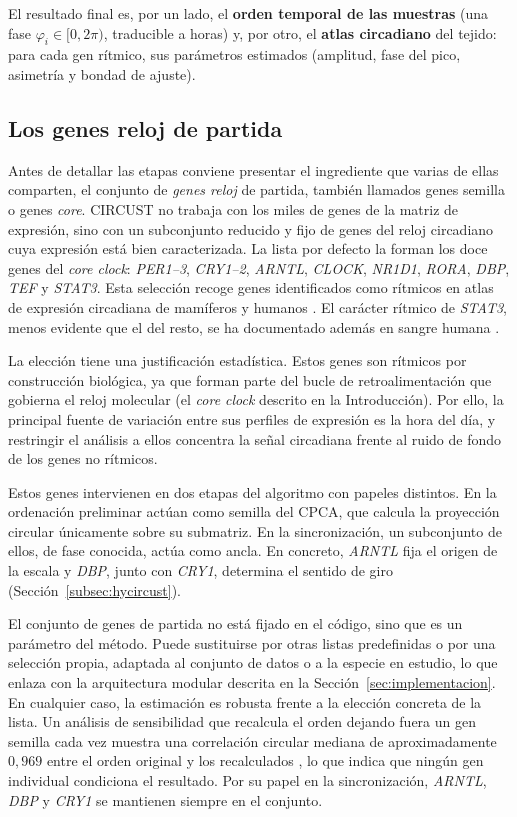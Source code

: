 \documentclass[12pt, a4paper]{report}
\begin{document}
El resultado final es, por un lado, el \textbf{orden temporal de las muestras} (una fase $\varphi_i\in[0,2\pi)$, traducible a horas) y, por otro, el \textbf{atlas circadiano} del tejido: para cada gen rítmico, sus parámetros estimados (amplitud, fase del pico, asimetría y bondad de ajuste).

\subsection{Los genes reloj de partida}
\label{subsec:core-genes}

Antes de detallar las etapas conviene presentar el ingrediente que varias de ellas comparten, el conjunto de \emph{genes reloj} de partida, también llamados genes semilla o genes \textit{core}. CIRCUST no trabaja con los miles de genes de la matriz de expresión, sino con un subconjunto reducido y fijo de genes del reloj circadiano cuya expresión está bien caracterizada. La lista por defecto la forman los doce genes del \textit{core clock}: \textit{PER1--3}, \textit{CRY1--2}, \textit{ARNTL}, \textit{CLOCK}, \textit{NR1D1}, \textit{RORA}, \textit{DBP}, \textit{TEF} y \textit{STAT3}. Esta selección recoge genes identificados como rítmicos en atlas de expresión circadiana de mamíferos y humanos \cite{zhang2014, CYCLOPS, ruben2018, wu2018, mure2018}. El carácter rítmico de \textit{STAT3}, menos evidente que el del resto, se ha documentado además en sangre humana \cite{lech2016, bozek2009}.

La elección tiene una justificación estadística. Estos genes son rítmicos por construcción biológica, ya que forman parte del bucle de retroalimentación que gobierna el reloj molecular (el \textit{core clock} descrito en la Introducción). Por ello, la principal fuente de variación entre sus perfiles de expresión es la hora del día, y restringir el análisis a ellos concentra la señal circadiana frente al ruido de fondo de los genes no rítmicos.

Estos genes intervienen en dos etapas del algoritmo con papeles distintos. En la ordenación preliminar actúan como semilla del CPCA, que calcula la proyección circular únicamente sobre su submatriz. En la sincronización, un subconjunto de ellos, de fase conocida, actúa como ancla. En concreto, \textit{ARNTL} fija el origen de la escala y \textit{DBP}, junto con \textit{CRY1}, determina el sentido de giro (Sección~\ref{subsec:hycircust}).

El conjunto de genes de partida no está fijado en el código, sino que es un parámetro del método. Puede sustituirse por otras listas predefinidas o por una selección propia, adaptada al conjunto de datos o a la especie en estudio, lo que enlaza con la arquitectura modular descrita en la Sección~\ref{sec:implementacion}. En cualquier caso, la estimación es robusta frente a la elección concreta de la lista. Un análisis de sensibilidad que recalcula el orden dejando fuera un gen semilla cada vez muestra una correlación circular mediana de aproximadamente $0{,}969$ entre el orden original y los recalculados \cite{larriba2023}, lo que indica que ningún gen individual condiciona el resultado. Por su papel en la sincronización, \textit{ARNTL}, \textit{DBP} y \textit{CRY1} se mantienen siempre en el conjunto.
\end{document}
